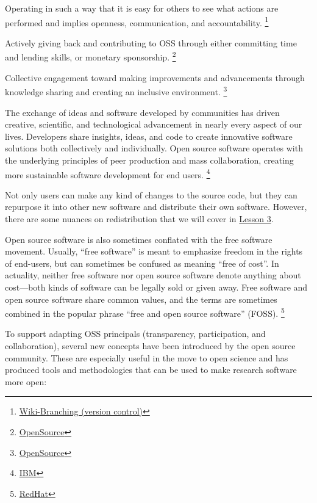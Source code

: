 \documentclass[
  letterpaper,
  DIV=11,
  numbers=noendperiod]{scrreport}
\providecommand{\tightlist}{%
  \setlength{\itemsep}{0pt}\setlength{\parskip}{0pt}}\usepackage{longtable,booktabs,array}
\begin{document}
\begin{description}
\tightlist
\item[Transparency]
Operating in such a way that it is easy for others to see what actions
are performed and implies openness, communication, and accountability.
\footnote{\href{https://en.wikipedia.org/wiki/Branching_(version_control)}{Wiki-Branching
  (version control)}}
\item[Participation]
Actively giving back and contributing to OSS through either committing
time and lending skills, or monetary sponsorship. \footnote{\href{https://opensource.com/principles}{OpenSource}}
\item[Collaboration]
Collective engagement toward making improvements and advancements
through knowledge sharing and creating an inclusive environment.
\footnote{\href{https://opensource.com/principles}{OpenSource}}
\end{description}

The exchange of ideas and software developed by communities has driven
creative, scientific, and technological advancement in nearly every
aspect of our lives. Developers share insights, ideas, and code to
create innovative software solutions both collectively and individually.
Open source software operates with the underlying principles of peer
production and mass collaboration, creating more sustainable software
development for end users. \footnote{\href{https://www.ibm.com/topics/open-source}{IBM}}

Not only users can make any kind of changes to the source code, but they
can repurpose it into other new software and distribute their own
software. However, there are some nuances on redistribution that we will
cover in
\href{https://hackmd.io/@TOPS-OC3-code/rk2U4xz5q/\%2FtDBYARbRTZObZUQuKbFJ6Q}{Lesson
3}.

Open source software is also sometimes conflated with the free software
movement. Usually, ``free software'' is meant to emphasize freedom in
the rights of end-users, but can sometimes be confused as meaning ``free
of cost''. In actuality, neither free software nor open source software
denote anything about cost---both kinds of software can be legally sold
or given away. Free software and open source software share common
values, and the terms are sometimes combined in the popular phrase
``free and open source software'' (FOSS). \footnote{\href{https://www.redhat.com/en/topics/open-source/what-is-open-source-software}{RedHat}}

To support adapting OSS principals (transparency, participation, and
collaboration), several new concepts have been introduced by the open
source community. These are especially useful in the move to open
science and has produced tools and methodologies that can be used to
make research software more open:
\end{document}
